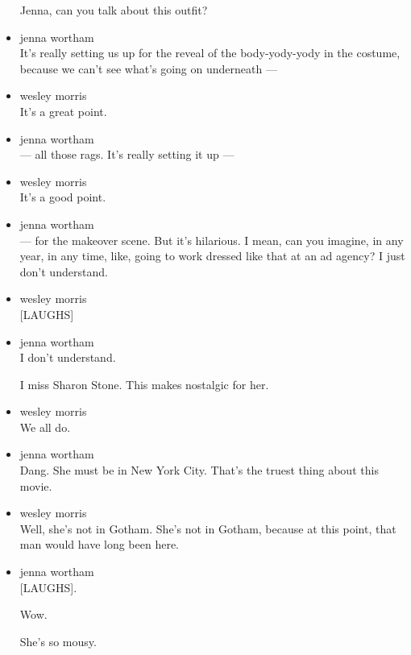\begin{itemize}
  Jenna, can you talk about this outfit?
\item
  jenna wortham\\
  It's really setting us up for the reveal of the body-yody-yody in the
  costume, because we can't see what's going on underneath ---
\item
  wesley morris\\
  It's a great point.
\item
  jenna wortham\\
  --- all those rags. It's really setting it up ---
\item
  wesley morris\\
  It's a good point.
\item
  jenna wortham\\
  --- for the makeover scene. But it's hilarious. I mean, can you
  imagine, in any year, in any time, like, going to work dressed like
  that at an ad agency? I just don't understand.
\item
  wesley morris\\
  {[}LAUGHS{]}
\item
  jenna wortham\\
  I don't understand.

  I miss Sharon Stone. This makes nostalgic for her.
\item
  wesley morris\\
  We all do.
\item
  jenna wortham\\
  Dang. She must be in New York City. That's the truest thing about this
  movie.
\item
  wesley morris\\
  Well, she's not in Gotham. She's not in Gotham, because at this point,
  that man would have long been here.
\item
  jenna wortham\\
  {[}LAUGHS{]}.

  Wow.

  She's so mousy.


\end{itemize}
